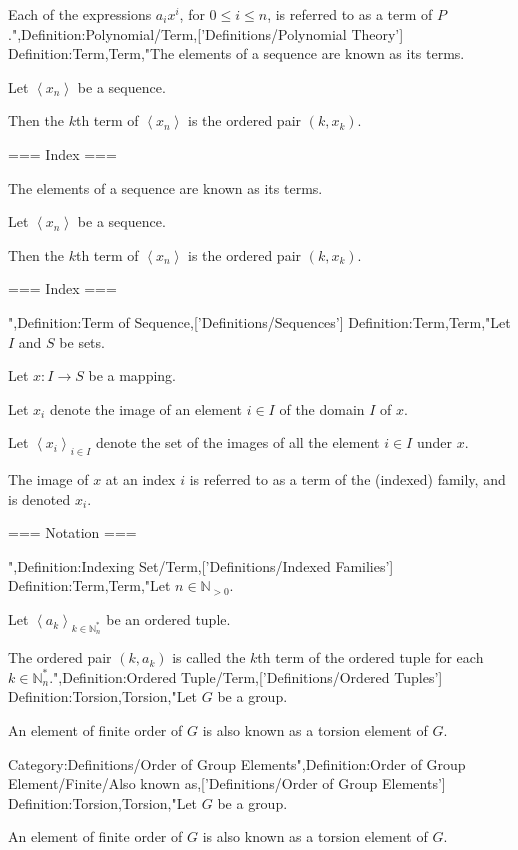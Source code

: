 Each of the expressions $a_i x^i$, for $0 \le i \le n$, is referred to as a term of $P$.",Definition:Polynomial/Term,['Definitions/Polynomial Theory']
Definition:Term,Term,"The elements of a sequence are known as its terms.


Let $\left\langle x_n \right\rangle$ be a sequence.

Then the $k$th term of $\left\langle x_n \right\rangle$ is the ordered pair $\left( k, x_k \right)$.


=== Index ===

The elements of a sequence are known as its terms.


Let $\left\langle x_n \right\rangle$ be a sequence.

Then the $k$th term of $\left\langle x_n \right\rangle$ is the ordered pair $\left( k, x_k \right)$.


=== Index ===

",Definition:Term of Sequence,['Definitions/Sequences']
Definition:Term,Term,"Let $I$ and $S$ be sets.

Let $x: I \to S$ be a mapping.

Let $x_i$ denote the image of an element $i \in I$ of the domain $I$ of $x$.

Let $\left\langle x_i \right\rangle_{i \mathop \in I}$ denote the set of the images of all the element $i \in I$ under $x$.


The image of $x$ at an index $i$ is referred to as a term of the (indexed) family, and is denoted $x_i$.


=== Notation ===

",Definition:Indexing Set/Term,['Definitions/Indexed Families']
Definition:Term,Term,"Let $n \in \mathbb N_{>0}$.

Let $\left\langle a_k \right\rangle_{k \mathop \in \mathbb N^*_n}$ be an ordered tuple.

The ordered pair $\left( k, a_k \right)$ is called the $k$th term of the ordered tuple for each $k \in \mathbb N^*_n$.",Definition:Ordered Tuple/Term,['Definitions/Ordered Tuples']
Definition:Torsion,Torsion,"Let $G$ be a group.


An element of finite order of $G$ is also known as a torsion element of $G$.


Category:Definitions/Order of Group Elements",Definition:Order of Group Element/Finite/Also known as,['Definitions/Order of Group Elements']
Definition:Torsion,Torsion,"Let $G$ be a group.


An element of finite order of $G$ is also known as a torsion element of $G$.


